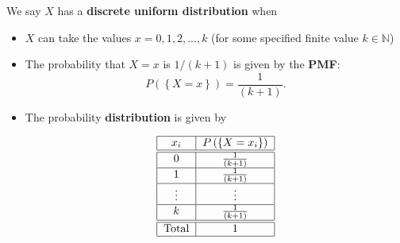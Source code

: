 \documentclass[smaller]{beamer}\usepackage[]{graphicx}\usepackage[]{color}
\begin{document}
\begin{frame}{\secname}
  \begin{small}
  \begin{definition}
  We say $X$ has a \textbf{discrete uniform distribution} when

  \begin{itemize}
  \item $X$ can take the values $x=0,1,2,...,k$ (for some specified finite value $k\in \mathbb{N}$)
  \item The probability that $X=x$ is $1/\left( k+1\right) $ is given by the \textbf{PMF}:
  $$
  P\left(\left\{ X=x\right\}\right) = \frac{1}{\left( k+1\right)}.
  $$

  \pause
  \item The probability \textbf{distribution} is given by
  \begin{small}
  \begin{equation*}
  \begin{tabular}{|c|c|}
  \hline
  $x_i$ & $P \left(\left\{ X=x_i\right\}\right) $ \\ \hline\hline
  $0$ & $\frac{1}{\left( k+1\right) }$ \\ \hline
  $1$ & $\frac{1}{\left( k+1\right) }$ \\ \hline
  $\vdots $ & $\vdots $ \\ \hline
  $k$ & $\frac{1}{\left( k+1\right) }$ \\ \hline\hline
  Total & $1$ \\ \hline
  \end{tabular}
  \end{equation*}
  \end{small}
  \end{itemize}
  \end{definition}
  \end{small}
\end{frame}
\end{document}
